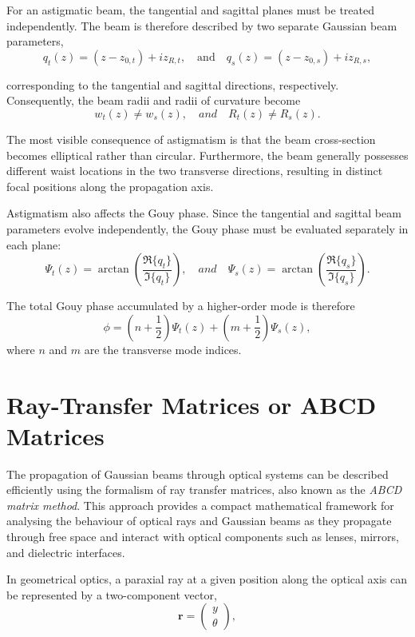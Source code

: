 \documentclass{report}
\begin{document}
For an astigmatic beam, the tangential and sagittal planes must be treated independently. The beam is therefore described by two separate Gaussian beam parameters,
\begin{equation}
q_t(z)=(z-z_{0,t})+iz_{R,t}, \quad \text{and} \quad
q_s(z)=(z-z_{0,s})+iz_{R,s},
\end{equation}

corresponding to the tangential and sagittal directions, respectively. Consequently, the beam radii and radii of curvature become
\begin{equation}
w_t(z)\neq w_s(z),
\quad
and
\quad
R_t(z)\neq R_s(z).
\end{equation}

The most visible consequence of astigmatism is that the beam cross-section becomes elliptical rather than circular. Furthermore, the beam generally possesses different waist locations in the two transverse directions, resulting in distinct focal positions along the propagation axis.

Astigmatism also affects the Gouy phase. Since the tangential and sagittal beam parameters evolve independently, the Gouy phase must be evaluated separately in each plane:
\begin{equation}
\Psi_t(z)
=
\arctan
\left(
\frac{\Re\{q_t\}}
     {\Im\{q_t\}}
\right),
\quad
and
\quad
\Psi_s(z)
=
\arctan
\left(
\frac{\Re\{q_s\}}
     {\Im\{q_s\}}
\right).
\end{equation}

The total Gouy phase accumulated by a higher-order mode is therefore
\begin{equation}
\phi
=
\left(n+\frac{1}{2}\right)\Psi_t(z)
+
\left(m+\frac{1}{2}\right)\Psi_s(z),
\end{equation}
where $n$ and $m$ are the transverse mode indices.

\section{Ray-Transfer Matrices or ABCD Matrices}
The propagation of Gaussian beams through optical systems can be described efficiently using the formalism of ray transfer matrices, also known as the \textit{ABCD matrix method}. This approach provides a compact mathematical framework for analysing the behaviour of optical rays and Gaussian beams as they propagate through free space and interact with optical components such as lenses, mirrors, and dielectric interfaces.

In geometrical optics, a paraxial ray at a given position along the optical axis can be represented by a two-component vector,
\begin{equation}
\mathbf{r}
=
\begin{pmatrix}
y \\
\theta
\end{pmatrix},
\end{equation}
\end{document}
